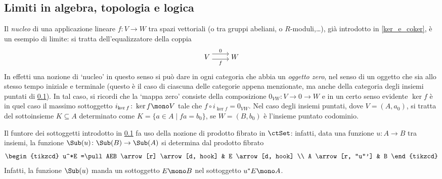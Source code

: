 \subsection{Limiti in algebra, topologia e logica}
\begin{example}
	Il \emph{nucleo} di una applicazione lineare \(f \colon V \to W\) tra spazi vettoriali (o tra gruppi abeliani, o \(R\)-moduli,\dots), già introdotto in \ref{ker_e_coker}, è un esempio di limite: si tratta dell'equalizzatore della coppia
	\[\begin{tikzcd}[cramped]
			V & W
			\arrow["0", shift left=2, from=1-1, to=1-2]
			\arrow["f"', shift right, from=1-1, to=1-2]
		\end{tikzcd}\]
	In effetti una nozione di `nucleo' in questo senso si può dare in ogni categoria che abbia un \emph{oggetto zero}, nel senso di un oggetto che sia allo stesso tempo iniziale e terminale (questo è il caso di ciascuna delle categorie appena menzionate, ma anche della categoria degli insiemi puntati di \ref{}). In tal caso, si ricordi che la `mappa zero' consiste della composizione \(0_{VW} \colon V \to 0 \to W\) e in un certo senso evidente \(\ker f\) è in quel caso il massimo sottoggetto \(i_{\ker f} \colon \ker f \mono V\) tale che \(f\circ i_{\ker f} = 0_{VW}\). Nel caso degli insiemi puntati, dove \(V=(A,a_0)\), si tratta del sottoinsieme \(K\subseteq A\) determinato come \(K=\{a\in A\mid fa = b_0\}\), se \(W=(B,b_0)\) è l'insieme puntato codominio.
\end{example}
\begin{example}
	Il funtore dei sottoggetti introdotto in \ref{} fa uso della nozione di prodotto fibrato in \(\ctSet\): infatti, data una funzione \(u \colon A\to B\) tra insiemi, la funzione \(\Sub(u) \colon \Sub(B) \to \Sub(A)\) si determina dal prodotto fibrato
	\[\begin{tikzcd}
			u^*E =\pull AEB \arrow[r] \arrow[d, hook] & E \arrow[d, hook] \\
			A \arrow[r, "u"'] & B
		\end{tikzcd}\]
	Infatti, la funzione \(\Sub(u)\) manda un sottoggetto \(E\mono B\) nel sottoggetto \(u^*E\mono A\).
\end{example}
\begin{example}
\end{example}
\begin{example}
\end{example}
